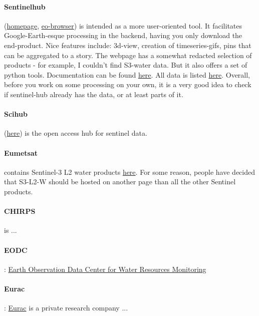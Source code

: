 \paragraph{Sentinelhub} (\href{https://www.sentinel-hub.com/}{homepage}, \href{https://www.sentinel-hub.com/explore/eobrowser/}{eo-browser}) is intended as a more user-oriented tool.
It facilitates Google-Earth-esque processing in the backend, having you only download the end-product. Nice features include: 3d-view, creation of timeseries-gifs, pins that can be aggregated to a story.
The webpage has a somewhat redacted selection of products - for example, I couldn't find S3-water data.
But it also offers a set of python tools. Documentation can be found \href{https://sentinelhub-py.readthedocs.io/en/latest/examples/process_request.html#Example-5:-Other-Data-Collections}{here}.
All data is listed \href{https://www.sentinel-hub.com/explore/data/}{here}. 
Overall, before you work on some processing on your own, it is a very good idea to check if sentinel-hub already has the data, or at least parts of it.

\paragraph{Scihub} (\href{https://scihub.copernicus.eu/}{here}) is the open access hub for sentinel data.

\paragraph{Eumetsat} contains Sentinel-3 L2 water products \href{https://coda.eumetsat.int/#/home}{here}.
For some reason, people have decided that S3-L2-W should be hosted on another page than all the other Sentinel products.


\paragraph{CHIRPS} is ...

\paragraph{EODC}: \href{https://www.eodc.eu/}{Earth Observation Data Center for Water Resources Monitoring}

\paragraph{Eurac}: \href{http://www.eurac.edu}{Eurac} is a private research company ...

